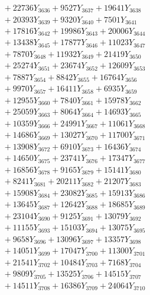 \documentclass[a4paper,10pt]{article}
\begin{document}
{\begin{align}
&\;  + 22736 Y_{3636} + 9527 Y_{3637} + 19641 Y_{3638} \\[0.3ex]
&\;  + 20393 Y_{3639} + 9320 Y_{3640} + 7501 Y_{3641} \\[0.3ex]
&\;  + 17816 Y_{3642} + 19986 Y_{3643} + 20006 Y_{3644} \\[0.3ex]
&\;  + 13438 Y_{3645} + 17877 Y_{3646} + 11023 Y_{3647} \\[0.3ex]
&\;  + 7870 Y_{3648} + 11932 Y_{3649} + 21419 Y_{3650} \\[0.3ex]
&\;  + 25274 Y_{3651} + 23674 Y_{3652} + 12609 Y_{3653} \\[0.3ex]
&\;  + 7887 Y_{3654} + 8842 Y_{3655} + 16764 Y_{3656} \\[0.3ex]
&\;  + 9970 Y_{3657} + 16411 Y_{3658} + 6935 Y_{3659} \\[0.5ex]\allowbreak
&\;  + 12955 Y_{3660} + 7840 Y_{3661} + 15978 Y_{3662} \\[0.3ex]
&\;  + 25059 Y_{3663} + 8064 Y_{3664} + 14693 Y_{3665} \\[0.3ex]
&\;  + 10359 Y_{3666} + 24991 Y_{3667} + 11061 Y_{3668} \\[0.3ex]
&\;  + 14686 Y_{3669} + 13027 Y_{3670} + 11700 Y_{3671} \\[0.3ex]
&\;  + 13908 Y_{3672} + 6910 Y_{3673} + 16436 Y_{3674} \\[0.3ex]
&\;  + 14650 Y_{3675} + 23741 Y_{3676} + 17347 Y_{3677} \\[0.3ex]
&\;  + 16856 Y_{3678} + 9165 Y_{3679} + 15141 Y_{3680} \\[0.3ex]
&\;  + 8241 Y_{3681} + 20211 Y_{3682} + 21207 Y_{3683} \\[0.3ex]
&\;  + 15908 Y_{3684} + 23082 Y_{3685} + 15913 Y_{3686} \\[0.3ex]
&\;  + 13645 Y_{3687} + 12642 Y_{3688} + 18685 Y_{3689} \\[0.5ex]\allowbreak
&\;  + 23104 Y_{3690} + 9125 Y_{3691} + 13079 Y_{3692} \\[0.3ex]
&\;  + 11155 Y_{3693} + 15103 Y_{3694} + 13075 Y_{3695} \\[0.3ex]
&\;  + 9658 Y_{3696} + 13096 Y_{3697} + 13357 Y_{3698} \\[0.3ex]
&\;  + 14051 Y_{3699} + 17047 Y_{3700} + 11300 Y_{3701} \\[0.3ex]
&\;  + 21541 Y_{3702} + 10484 Y_{3703} + 7168 Y_{3704} \\[0.3ex]
&\;  + 9809 Y_{3705} + 13525 Y_{3706} + 14515 Y_{3707} \\[0.3ex]
&\;  + 14511 Y_{3708} + 16386 Y_{3709} + 24064 Y_{3710} \\[0.3ex]

\end{align}}
\end{document}
